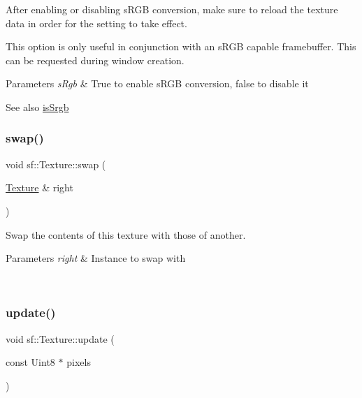 After enabling or disabling s\+R\+GB conversion, make sure to reload the texture data in order for the setting to take effect.

This option is only useful in conjunction with an s\+R\+GB capable framebuffer. This can be requested during window creation.


\begin{DoxyParams}{Parameters}
{\em s\+Rgb} & True to enable s\+R\+GB conversion, false to disable it\\
\hline
\end{DoxyParams}
\begin{DoxySeeAlso}{See also}
\mbox{\hyperlink{classsf_1_1_texture_a9d77ce4f8124abfda96900a6bd53bfe9}{is\+Srgb}} \begin{DoxyVerb}\end{DoxyVerb}
 
\end{DoxySeeAlso}
\mbox{\label{classsf_1_1_texture_a9243470c64b7ff0d231e00663e495798}} 
\subsubsection{\texorpdfstring{swap()}{swap()}}
{\footnotesize\ttfamily void sf\+::\+Texture\+::swap (\begin{DoxyParamCaption}\item[{\mbox{\hyperlink{classsf_1_1_texture}{Texture}} \&}]{right }\end{DoxyParamCaption})}



Swap the contents of this texture with those of another. 


\begin{DoxyParams}{Parameters}
{\em right} & Instance to swap with \begin{DoxyVerb}\end{DoxyVerb}
 \\
\hline
\end{DoxyParams}
\mbox{\label{classsf_1_1_texture_ae4eab5c6781316840b0c50ad08370963}} 
\subsubsection{\texorpdfstring{update()}{update()}\hspace{0.1cm}{\footnotesize\ttfamily [1/8]}}
{\footnotesize\ttfamily void sf\+::\+Texture\+::update (\begin{DoxyParamCaption}\item[{const Uint8 $\ast$}]{pixels }\end{DoxyParamCaption})}



